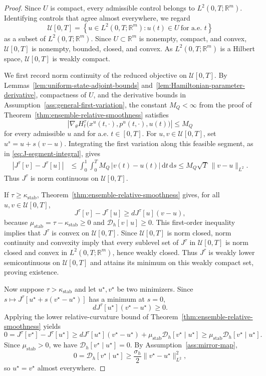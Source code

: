 \documentclass[11pt]{amsart}
\numberwithin{equation}{section} %
\newcommand{\dd}{\mathrm{d}}
\theoremstyle{remark}
\begin{document}
\begin{proof}
Since \(U\) is compact, every admissible control belongs to \(L^2(0,T;\mathbb R^m)\). Identifying controls that agree almost everywhere, we regard
$$ \mathcal U[0,T] = \left\{ u\in L^2(0,T;\mathbb R^m): u(t)\in U\ \text{for a.e. }t \right\} $$
as a subset of \(L^2(0,T;\mathbb R^m)\). Since \(U\subset\mathbb R^m\) is nonempty, compact, and convex, \(\mathcal U[0,T]\) is nonempty, bounded, closed, and convex. As \(L^2(0,T;\mathbb R^m)\) is a Hilbert space, \(\mathcal U[0,T]\) is weakly compact.

We first record norm continuity of the reduced objective on $\mathcal U[0,T]$.
By Lemmas~\ref{lem:uniform-state-adjoint-bounds} and~\ref{lem:Hamiltonian-parameter-derivative}, compactness of $U$, and the derivative bounds in
Assumption~\ref{ass:general-first-variation}, the constant
$M_Q<\infty$ from the proof of
Theorem~\ref{thm:ensemble-relative-smoothness} satisfies
\[
\left|
\nabla_\theta H_t^\tau
\bigl(x^u(t,\cdot),p^u(t,\cdot),u(t)\bigr)
\right|
\le M_Q
\]
for every admissible $u$ and for a.e. $t\in[0,T]$. For $u,v\in\mathcal U[0,T]$,
set $u^s=u+s(v-u)$. Integrating the first variation along this feasible
segment, as in \eqref{eq:J-segment-integral}, gives
\[
\begin{aligned}
|J^\tau[v]-J^\tau[u]|
&\le
\int_0^1\int_0^T
M_Q\,|v(t)-u(t)|\,\dd t\,\dd s \le
M_Q\sqrt T\,\|v-u\|_{L^2}.
\end{aligned}
\]
Thus $J^\tau$ is norm continuous on $\mathcal U[0,T]$.

If $\tau\ge\kappa_{\mathrm{stab}}$, Theorem~\ref{thm:ensemble-relative-smoothness} gives, for all
$u,v\in\mathcal U[0,T]$,
\[
J^\tau[v]-J^\tau[u]
\ge
dJ^\tau[u](v-u),
\]
because $\mu_{\mathrm{stab}}=\tau-\kappa_{\mathrm{stab}}\ge0$ and
$\mathcal D_h[v\mid u]\ge0$. This first-order inequality implies that $J^\tau$ is
convex on $\mathcal U[0,T]$. Since $\mathcal U[0,T]$ is norm closed, norm continuity and convexity
imply that every sublevel set of $J^\tau$ in $\mathcal U[0,T]$ is
norm closed and convex in $L^2(0,T;\mathbb R^m)$, hence weakly closed.
Thus $J^\tau$ is weakly lower semicontinuous on $\mathcal U[0,T]$
and attains its minimum on this weakly compact set, proving existence.

Now suppose $\tau>\kappa_{\mathrm{stab}}$ and let $u^\star,v^\star$ be
two minimizers. Since
$s\mapsto J^\tau[u^\star+s(v^\star-u^\star)]$ has a minimum at $s=0$,
\[
dJ^\tau[u^\star](v^\star-u^\star)\ge0.
\]
Applying the lower relative-curvature bound of Theorem~\ref{thm:ensemble-relative-smoothness} yields
\[
0
=
J^\tau[v^\star]-J^\tau[u^\star]
\ge
dJ^\tau[u^\star](v^\star-u^\star)
+
\mu_{\mathrm{stab}}\mathcal D_h[v^\star\mid u^\star]
\ge
\mu_{\mathrm{stab}}\mathcal D_h[v^\star\mid u^\star].
\]
Since $\mu_{\mathrm{stab}}>0$, we have
$\mathcal D_h[v^\star\mid u^\star]=0$. By Assumption~\ref{ass:mirror-map},
\[
0
=
\mathcal D_h[v^\star\mid u^\star]
\ge
\frac{\sigma_h}{2}
\|v^\star-u^\star\|_{L^2}^2,
\]
so $u^\star=v^\star$ almost everywhere.
\end{proof}
\end{document}
